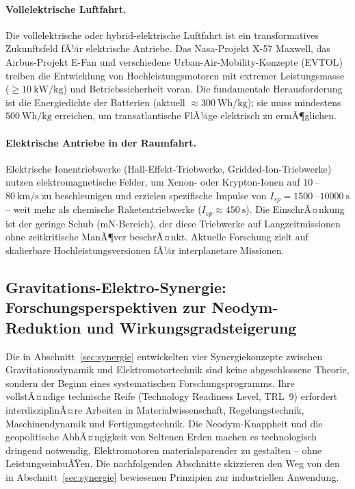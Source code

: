 ﻿\documentclass[12pt, a4paper]{report}
\theoremstyle{definition}
\theoremstyle{remark}
\begin{document}
\paragraph{Vollelektrische Luftfahrt.}
Die vollelektrische oder hybrid-elektrische Luftfahrt ist ein transformatives
Zukunftsfeld fÃ¼r elektrische Antriebe. Das Nasa-Projekt X-57 Maxwell, das
Airbus-Projekt E-Fan und verschiedene Urban-Air-Mobility-Konzepte (EVTOL)
treiben die Entwicklung von Hochleistungsmotoren mit extremer Leistungsmasse
($\geq \SI{10}{\kilo\watt\per\kilogram}$) und Betriebssicherheit voran.
Die fundamentale Herausforderung ist die Energiedichte der Batterien (aktuell
$\approx \SI{300}{\watt\hour\per\kilogram}$); sie muss mindestens $\SI{500}
{\watt\hour\per\kilogram}$ erreichen, um transatlantische FlÃ¼ge elektrisch zu
ermÃ¶glichen.

\paragraph{Elektrische Antriebe in der Raumfahrt.}
Elektrische Ionentriebwerke (Hall-Effekt-Triebwerke, Gridded-Ion-Triebwerke)
nutzen elektromagnetische Felder, um Xenon- oder Krypton-Ionen auf
$\SI{10}{}$--$\SI{80}{\kilo\metre\per\second}$ zu beschleunigen und erzielen
spezifische Impulse von $I_{sp} = \SI{1500}{}$--$\SI{10000}{\second}$ -- weit
mehr als chemische Raketentriebwerke ($I_{sp} \approx \SI{450}{\second}$).
Die EinschrÃ¤nkung ist der geringe Schub ($\si{\milli\newton}$-Bereich), der
diese Triebwerke auf Langzeitmissionen ohne zeitkritische ManÃ¶ver beschrÃ¤nkt.
Aktuelle Forschung zielt auf skalierbare Hochleistungsversionen fÃ¼r
interplanetare Missionen.

\subsection{Gravitations-Elektro-Synergie: Forschungsperspektiven zur
               Neodym-Reduktion und Wirkungsgradsteigerung}
\label{ssec:ausblick_synergie}

Die in Abschnitt~\ref{sec:synergie} entwickelten vier Synergiekonzepte zwischen
Gravitationsdynamik und Elektromotortechnik sind keine abgeschlossene Theorie,
sondern der Beginn eines systematischen Forschungsprogramms. Ihre vollstÃ¤ndige
technische Reife (Technology Readiness Level, TRL~9) erfordert interdisziplinÃ¤re
Arbeiten in Materialwissenschaft, Regelungstechnik, Maschinendynamik und
Fertigungstechnik. Die Neodym-Knappheit und die geopolitische AbhÃ¤ngigkeit von
Seltenen Erden machen es technologisch dringend notwendig, Elektromotoren
materialsparender zu gestalten -- ohne LeistungseinbuÃŸen. Die nachfolgenden
Abschnitte skizzieren den Weg von den in Abschnitt~\ref{sec:synergie} bewiesenen
Prinzipien zur industriellen Anwendung.
\end{document}
